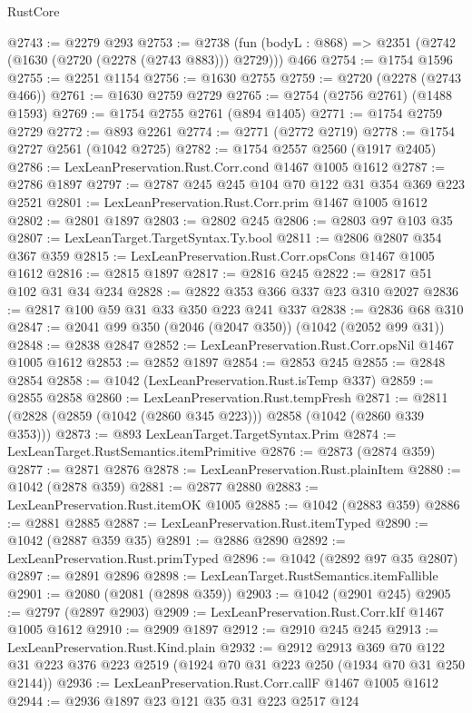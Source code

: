 \begin{lexlean}{RustCore}
\begin{coremodule}
@2743 := @2279 @293
@2753 := @2738 (fun (bodyL : @868) => @2351 (@2742 (@1630 (@2720 (@2278 (@2743 @883))) @2729))) @466
@2754 := @1754 @1596
@2755 := @2251 @1154
@2756 := @1630 @2755
@2759 := @2720 (@2278 (@2743 @466))
@2761 := @1630 @2759 @2729
@2765 := @2754 (@2756 @2761) (@1488 @1593)
@2769 := @1754 @2755 @2761 (@894 @1405)
@2771 := @1754 @2759 @2729
@2772 := @893 @2261
@2774 := @2771 (@2772 @2719)
@2778 := @1754 @2727 @2561 (@1042 @2725)
@2782 := @1754 @2557 @2560 (@1917 @2405)
@2786 := LexLeanPreservation.Rust.Corr.cond @1467 @1005 @1612
@2787 := @2786 @1897
@2797 := @2787 @245 @245 @104 @70 @122 @31 @354 @369 @223 @2521
@2801 := LexLeanPreservation.Rust.Corr.prim @1467 @1005 @1612
@2802 := @2801 @1897
@2803 := @2802 @245
@2806 := @2803 @97 @103 @35
@2807 := LexLeanTarget.TargetSyntax.Ty.bool
@2811 := @2806 @2807 @354 @367 @359
@2815 := LexLeanPreservation.Rust.Corr.opsCons @1467 @1005 @1612
@2816 := @2815 @1897
@2817 := @2816 @245
@2822 := @2817 @51 @102 @31 @34 @234
@2828 := @2822 @353 @366 @337 @23 @310 @2027
@2836 := @2817 @100 @59 @31 @33 @350 @223 @241 @337
@2838 := @2836 @68 @310
@2847 := @2041 @99 @350 (@2046 (@2047 @350)) (@1042 (@2052 @99 @31))
@2848 := @2838 @2847
@2852 := LexLeanPreservation.Rust.Corr.opsNil @1467 @1005 @1612
@2853 := @2852 @1897
@2854 := @2853 @245
@2855 := @2848 @2854
@2858 := @1042 (LexLeanPreservation.Rust.isTemp @337)
@2859 := @2855 @2858
@2860 := LexLeanPreservation.Rust.tempFresh
@2871 := @2811 (@2828 (@2859 (@1042 (@2860 @345 @223))) @2858 (@1042 (@2860 @339 @353)))
@2873 := @893 LexLeanTarget.TargetSyntax.Prim
@2874 := LexLeanTarget.RustSemantics.itemPrimitive
@2876 := @2873 (@2874 @359)
@2877 := @2871 @2876
@2878 := LexLeanPreservation.Rust.plainItem
@2880 := @1042 (@2878 @359)
@2881 := @2877 @2880
@2883 := LexLeanPreservation.Rust.itemOK @1005
@2885 := @1042 (@2883 @359)
@2886 := @2881 @2885
@2887 := LexLeanPreservation.Rust.itemTyped
@2890 := @1042 (@2887 @359 @35)
@2891 := @2886 @2890
@2892 := LexLeanPreservation.Rust.primTyped
@2896 := @1042 (@2892 @97 @35 @2807)
@2897 := @2891 @2896
@2898 := LexLeanTarget.RustSemantics.itemFallible
@2901 := @2080 (@2081 (@2898 @359))
@2903 := @1042 (@2901 @245)
@2905 := @2797 (@2897 @2903)
@2909 := LexLeanPreservation.Rust.Corr.kIf @1467 @1005 @1612
@2910 := @2909 @1897
@2912 := @2910 @245 @245
@2913 := LexLeanPreservation.Rust.Kind.plain
@2932 := @2912
    @2913
    @369
    @70
    @122
    @31
    @223
    @376
    @223
    @2519
    (@1924 @70 @31 @223 @250 (@1934 @70 @31 @250 @2144))
@2936 := LexLeanPreservation.Rust.Corr.callF @1467 @1005 @1612
@2944 := @2936 @1897 @23 @121 @35 @31 @223 @2517 @124

\end{coremodule}
\end{lexlean}
